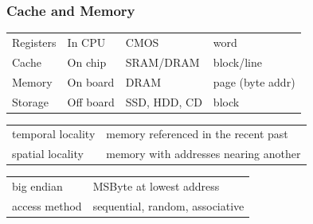 \documentclass[10pt]{article}
\begin{document}
\begin{multicols*}{2}
    \subsubsection*{Cache and Memory}

    \begin{tcolorbox}[title=Memory Hierachy and Principle of Locality, left=5pt, right=5pt, halign=flush left]
        \begin{tabular}{llll}
            Registers & In CPU    & CMOS         & word             \\
            Cache     & On chip   & SRAM/DRAM    & block/line       \\
            Memory    & On board  & DRAM         & page (byte addr) \\
            Storage   & Off board & SSD, HDD, CD & block            \\
            \hline
        \end{tabular}

        \begin{tabular}{ll}
            temporal locality & memory referenced in the recent past  \\
            spatial locality  & memory with addresses nearing another \\
            \hline
        \end{tabular}

        \begin{tabular}{ll}
            big endian    & MSByte at lowest address        \\
            access method & sequential, random, associative \\
        \end{tabular}

    \end{tcolorbox}


\end{multicols*}
\end{document}
